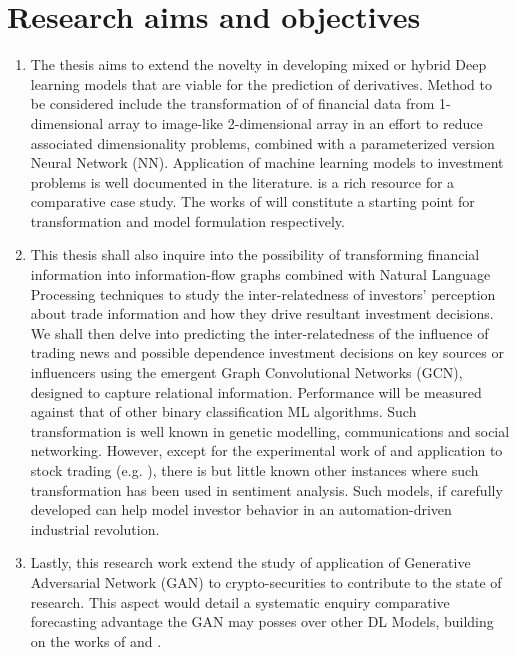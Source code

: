 \documentclass[a4paper,11pt]{scrartcl}
\begin{document}
\section{Research aims and objectives}
\begin{enumerate}
    \item The thesis aims to extend the novelty in developing mixed or hybrid Deep learning models that are viable for the prediction of derivatives. Method to be considered include the transformation of of financial data from 1-dimensional array to image-like 2-dimensional array in an effort to reduce associated dimensionality problems, combined with a parameterized version Neural Network (NN). Application of machine learning models to investment problems is well documented in the literature. \cite{ozbayoglu2020deep} is a rich resource for a comparative case study. The works of \cite{culkin2017machine, sezer2020financial} will constitute a starting point for transformation and model formulation respectively. \label{obj_1}
    \item This thesis shall also inquire into the possibility of transforming financial information into information-flow graphs combined with Natural Language Processing techniques to study the inter-relatedness of investors' perception about trade information and how they drive resultant investment decisions. We shall then delve into predicting the inter-relatedness of the influence of trading news and possible dependence investment decisions on key sources or influencers using the emergent  Graph Convolutional Networks (GCN), designed to capture relational information. Performance will be  measured against that of other binary classification ML algorithms.
          Such transformation is well known in genetic modelling, communications and social networking. However, except for the experimental work of  \cite{weber2019anti} and application to stock trading (e.g. \cite{chen2018incorporating,wang2019alphastock}), there is but little known other instances where such transformation has been used in sentiment analysis. Such models, if carefully developed can help model investor behavior in an automation-driven industrial revolution. \label{obj_2}
    \item Lastly, this research work extend the study of application of Generative Adversarial Network (GAN) to crypto-securities to contribute to the state of research. This aspect would detail a systematic enquiry comparative forecasting advantage the GAN may posses over other DL Models, building on the works of \cite{zola2020generative} and \cite{grilli2020generative}. \label{obj_3}
\end{enumerate}
\end{document}
